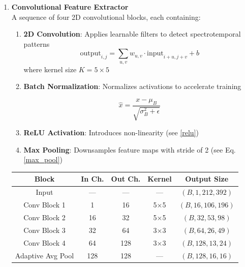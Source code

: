 \begin{enumerate}
    \item \textbf{Convolutional Feature Extractor} \\
    A sequence of four 2D convolutional blocks, each containing:
    \begin{enumerate}
        \item \textbf{2D Convolution}: Applies learnable filters to detect spectrotemporal patterns
        \begin{equation}\label{conv2d}
            \text{output}_{i,j} = \sum_{u,v} w_{u,v} \cdot \text{input}_{i+u, j+v} + b
        \end{equation}
        where kernel size $K=5 \times 5$
        
        \item \textbf{Batch Normalization}: Normalizes activations to accelerate training

        \begin{equation}\label{batchnorm}
            \hat{x} = \frac{x - \mu_B}{\sqrt{\sigma_B^2 + \epsilon}}
        \end{equation}
        
        \item \textbf{ReLU Activation}: Introduces non-linearity (see \eqref{relu})
        
        \item \textbf{Max Pooling}: Downsamples feature maps with stride of 2 
        (see Eq. \eqref{max_pool})
    \end{enumerate}

    \begin{center}
        \begin{tabular}{|c|c|c|c|c|}
        \hline
        \textbf{Block} & \textbf{In Ch.} & \textbf{Out Ch.} & \textbf{Kernel} & \textbf{Output Size} \\
        \hline
            Input & — & — & — & $(B, 1, 212, 392)$ \\
            Conv Block 1 & 1 & 16 & 5×5 & $(B, 16, 106, 196)$ \\
            Conv Block 2 & 16 & 32 & 5×5 & $(B, 32, 53, 98)$ \\
            Conv Block 3 & 32 & 64 & 3×3 & $(B, 64, 26, 49)$ \\
            Conv Block 4 & 64 & 128 & 3×3 & $(B, 128, 13, 24)$ \\
            Adaptive Avg Pool & 128 & 128 & — & $(B, 128, 16, 16)$ \\
        \hline
        \end{tabular}
    \end{center}


\end{enumerate}
